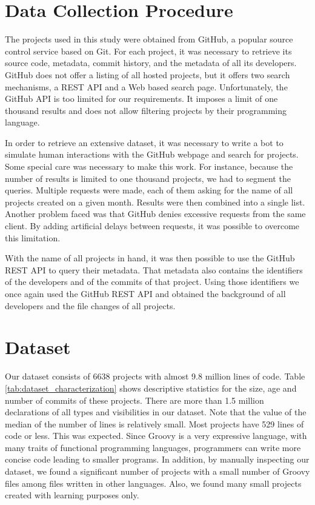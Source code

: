\documentclass[msc]{ppgccufmg}
\begin{document}
\section{Data Collection Procedure\label{data-collection}}
The projects used in this study were obtained from GitHub, a popular source control service based on Git.
For each project, it was necessary to retrieve its source code, metadata, commit history, and the metadata of all its developers.
GitHub does not offer a listing of all hosted projects, but it offers two search mechanisms, a REST API and a Web based search page.
Unfortunately, the GitHub API is too limited for our requirements.
It imposes a limit of one thousand results and does not allow filtering projects by their programming language.

In order to retrieve an extensive dataset, it was necessary to write a bot to simulate human interactions with the GitHub webpage and search for projects. 
Some special care was necessary to make this work. 
For instance, because the number of results is limited to one thousand projects, we had to segment the queries.
Multiple requests were made, each of them asking for the name of all projects created on a given month.
Results were then combined into a single list.
Another problem faced was that GitHub denies excessive requests from the same client.
By adding artificial delays between requests, it was possible to overcome this limitation.

With the name of all projects in hand, it was then possible to use the GitHub REST API to query their metadata.
That metadata also contains the identifiers of the developers and of the commits of that project.
Using those identifiers we once again used the GitHub REST API and obtained the background of all developers and the file changes of all projects.


\section{Dataset\label{dataset}}


Our dataset consists of 6638 projects with almost 9.8 million lines of code.
Table \ref{tab:dataset_characterization} shows descriptive statistics for the size, age and number of commits of these projects.
There are more than 1.5 million declarations of all types and visibilities in our dataset.
Note that the value of the median of the number of lines is relatively small.
Most projects have 529 lines of code or less.
This was expected.
Since Groovy is a very expressive language, with many traits of functional programming languages, programmers can write more concise code leading to smaller programs.
In addition, by manually inspecting our dataset, we found a significant number of projects with a small number of Groovy files among files written in other languages.
Also, we found many small projects created with learning purposes only.
\end{document}
